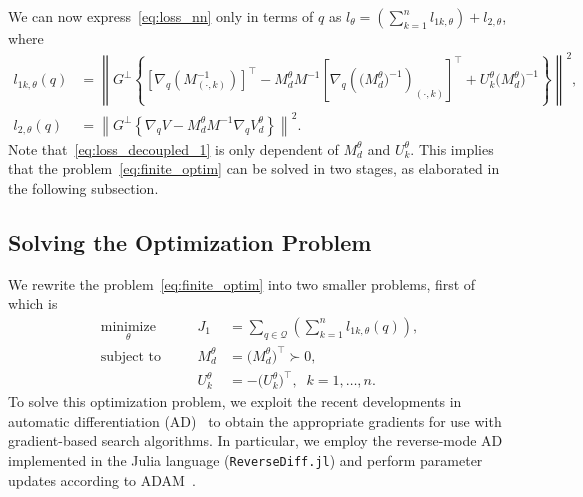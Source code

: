 We can now express~\eqref{eq:loss_nn} only in terms of $q$ as $l_\theta =
\left( \sum_{k=1}^n l_{1k,\theta} \right) + l_{2,\theta}$, where
\begin{align}
    \label{eq:loss_decoupled_1}
    l_{1k, \theta}(q) &= \left\| G^\perp \left\{ 
        \left[ \nabla_q \left( M^{-1}_{(\cdot, k)} \right) \right]^\top - 
        M_d^{\theta} M^{-1} \left[ \nabla_q  \left( \big( M_d^\theta \big)^{-1} \right)_{(\cdot, k)} \right]^\top + 
        U_k^\theta \big( M_d^\theta \big)^{-1}
    \right\} \right\|^2 , \\
    \label{eq:loss_decoupled_2}
    l_{2, \theta}(q) &= \left\| G^\perp \left\{ \nabla_qV - M_d^\theta M^{-1} \nabla_qV_d^\theta \right\} \right\|^2.
\end{align}
%
Note that~\eqref{eq:loss_decoupled_1} is only dependent of $M_d^\theta$ and
$U_k^\theta$. This implies that the problem~\eqref{eq:finite_optim} can be
solved in two stages, as elaborated in the following subsection.


\subsection{Solving the Optimization Problem}

We rewrite the problem~\eqref{eq:finite_optim} into two smaller problems, first
of which is
%
\begin{equation}
    \begin{aligned}
        \underset{\theta }{\textrm{minimize}} 
        &&\quad J_1 &= \sum_{q \in \mathcal{Q}} \left( \sum_{k=1}^n l_{1k,\theta}(q) \right) , \\
        \textrm{subject to} 
        &&\quad M_d^\theta &= \big( M_d^\theta \big)^\top \succ 0, \\
        &&\quad U_k^\theta &= -\big( U_k^\theta \big)^\top, \;\; k = 1,\ldots,n.
    \end{aligned}    
    \label{eq:solve_Md}
\end{equation}
%
To solve this optimization problem, we exploit the recent developments in
automatic differentiation (AD)~\citep{DifferentialEquations.jl-2017} to obtain
the appropriate gradients for use with gradient-based search algorithms. In
particular, we employ the reverse-mode AD implemented in the Julia language
(\verb|ReverseDiff.jl|) and perform parameter updates according to
ADAM~\citep{kingma2014adam}.

